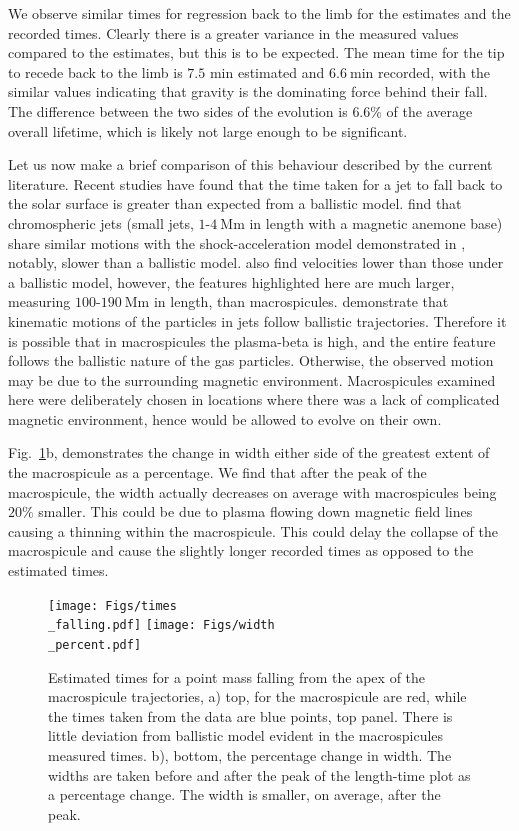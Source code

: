 We observe similar times for regression back to the limb for the estimates and the recorded times. Clearly there is a greater variance in the measured values compared to the estimates, but this is to be expected. The mean time for the tip to recede back to the limb is $7.5$ min estimated and $6.6\ \textrm{min}$ recorded, with the similar values indicating that gravity is the dominating force behind their fall. The difference between the two sides of the evolution is $6.6\%$ of the average overall lifetime, which is likely not large enough to be significant. 

Let us now make a brief comparison of this behaviour described by the current literature. Recent studies have found that the time taken for a jet to fall back to the solar surface is greater than expected from a ballistic model. \cite{Nishizuka2011} find that chromospheric jets (small jets, $1$-$4\ \textrm{Mm}$ in length with a magnetic anemone base) share similar motions with the shock-acceleration model demonstrated in \cite{ShibataSuematsu1982}, notably, slower than a ballistic model. \cite{Moschou2013} also find velocities lower than those under a ballistic model, however, the features highlighted here are much larger, measuring $100$-$190\ \textrm{Mm}$ in length, than macrospicules. \cite{Feng2012} demonstrate that kinematic motions of the particles in jets follow ballistic trajectories. Therefore it is possible that in macrospicules the plasma-beta is high, and the entire feature follows the ballistic nature of the gas particles. Otherwise, the observed motion may be due to the surrounding magnetic environment. Macrospicules examined here were deliberately chosen in locations where there was a lack of complicated magnetic environment, hence would be allowed to evolve on their own.



Fig.~\ref{fig:ballistics}b, demonstrates the change in width either side of the greatest extent of the macrospicule as a percentage. We find that after the peak of the macrospicule, the width actually decreases on average with macrospicules being $20\%$ smaller. This could be due to plasma flowing down magnetic field lines causing a thinning within the macrospicule. This could delay the collapse of the macrospicule and cause the slightly longer recorded times as opposed to the estimated times.       

\begin{figure}[h!]
	\centering
	\texttt{[image: Figs/times\\\_falling.pdf]}
	\texttt{[image: Figs/width\\\_percent.pdf]}
	
	\caption{\small Estimated times for a point mass falling from the apex of the macrospicule trajectories, a) top, for the macrospicule are red, while the times taken from the data are blue points, top panel. There is little deviation from ballistic model evident in the macrospicules measured times. b), bottom, the percentage change in width. The widths are taken before and after the peak of the length-time plot as a percentage change. The width is smaller, on average, after the peak.}
	\label{fig:ballistics}
\end{figure}

